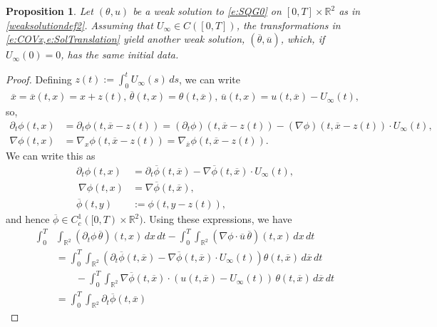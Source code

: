 \documentclass[11pt,reqno,xcolor=svgnames]{amsart}
\def\R{{\mathbb R}}
\theoremstyle{plain}
\newtheorem{prop}[theorem]{Proposition}
\theoremstyle{definition}
\theoremstyle{plain}
\theoremstyle{remark}
\newcommand{\iny}{\ensuremath{\infty}}
\newcommand{\grad}{\ensuremath{\nabla}}
\newcommand{\prt}{\ensuremath{\partial}}
\newcommand{\pr}[1]{\ensuremath{\left( #1 \right) }}
\newcommand{\ol}{\overline}
\newcommand{\ox}{{\ol{x}}}
\newcommand{\otheta}{\ol{\theta}}
\newcommand{\ou}{\ol{u}}
\begin{document}
\begin{prop}\label{P:SQG0Nonunique}
Let $(\theta, u)$ be a weak solution to \cref{e:SQG0} on $[0,T] \times \R^2$ as in \cref{weaksolutiondef2}. Assuming that $U_\iny \in C([0, T])$, the transformations in \cref{e:COVx,e:SolTranslation} yield another weak solution, $(\otheta, \ou)$, which, if $U_\iny(0) = 0$, has the same initial data.
\end{prop}
\newcommand{\ophi}{\ol{\phi}}
\begin{proof}
    Defining $z(t) := \int_0^t U_\iny(s) \, ds$, we can write
    \begin{align*}
        \ox = \ox(t, x) = x + z(t), \,
        \otheta(t, x) = \theta(t, \ox), \,
        \ou(t, x) = u(t, \ox) - U_\iny(t),
    \end{align*}
    so,
    \begin{align*}
        \prt_t \phi(t, x)
            &= \prt_t \phi(t, \ox - z(t))
            = (\prt_t \phi)(t, \ox - z(t))
            - (\grad \phi)(t, \ox - z(t)) \cdot U_\iny(t), \\
        \grad \phi(t, x)
            &= \grad_x \phi(t, \ox - z(t))
            = \grad_{\ox} \phi(t, \ox - z(t)).
    \end{align*}
    We can write this as
    \begin{align*}
        \prt_t \phi(t, x)
            &= \prt_t \ophi(t, \ox) - \grad \ophi(t, \ox) \cdot U_\iny(t), \\\
        \grad \phi(t, x)
            &= \grad \ophi(t, \ox), \\
        \ophi(t, y)
            &:= \phi(t, y - z(t)),
    \end{align*}
    and hence $\ophi \in C^1_c([0, T) \times \R^2)$.
    Using these expressions, we have
    \begin{align*}
        \int_0^T &\int_{\R^2} (\prt_t \phi \, \otheta)(t, x) \, dx \, dt
                - \int_0^T \int_{\R^2}
                    (\grad \phi \cdot \ou \, \otheta)(t, x) \, dx \, dt \\
            &= \int_0^T \int_{\R^2}
                \pr{\prt_t \ophi(t, \ox) - \grad \ophi(t, \ox) \cdot U_\iny(t)}
                \theta(t, \ox)
                \, d \ox \, dt \\
            &\qquad
                - \int_0^T \int_{\R^2}
                    \grad \ophi(t, \ox) \cdot
                    (u(t, \ox) - U_\iny(t)) \, \theta(t, \ox)
                \, d \ox \, dt \\
           &= \int_0^T \int_{\R^2}
                \prt_t \ophi(t, \ox)

\end{align*}
\end{proof}
\end{document}
